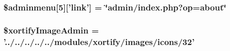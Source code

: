 \hypertarget{menu_8php_a86c31a48d4510b1076e6fbfb731ba1d8}{
\subsubsection[{\$adminmenu}]{\setlength{\rightskip}{0pt plus 5cm}\$adminmenu\mbox{[}5\mbox{]}\mbox{[}'link'\mbox{]} = \char`\"{}admin/index.\-php?op=about\char`\"{}}}\label{menu_8php_a86c31a48d4510b1076e6fbfb731ba1d8}
\hypertarget{menu_8php_a3ab6c4c4d121f975136f6a49bda61104}{
\subsubsection[{\$xortify\-Image\-Admin}]{\setlength{\rightskip}{0pt plus 5cm}\$xortify\-Image\-Admin = '../../../../../modules/xortify/images/icons/32'}}\label{menu_8php_a3ab6c4c4d121f975136f6a49bda61104}

